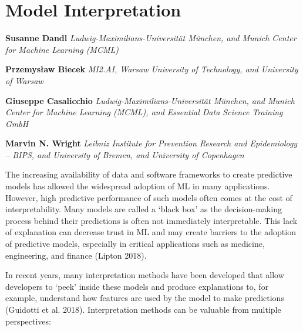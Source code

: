 \hypertarget{sec-interpretation}{%
\chapter{Model Interpretation}\label{sec-interpretation}}

\vspace{-15mm}

\textbf{Susanne Dandl} \newline  \emph{Ludwig-Maximilians-Universität
München, and Munich Center for Machine Learning (MCML)}

\textbf{Przemysław Biecek} \newline  \emph{MI2.AI, Warsaw University of
Technology, and University of Warsaw}

\textbf{Giuseppe Casalicchio} \newline 
\emph{Ludwig-Maximilians-Universität München, and Munich Center for
Machine Learning (MCML), and Essential Data Science Training GmbH}

\textbf{Marvin N. Wright} \newline  \emph{Leibniz Institute for
Prevention Research and Epidemiology -- BIPS, and University of Bremen,
and University of Copenhagen} \newline \newline 

The increasing availability of data and software frameworks to create
predictive models has allowed the widespread adoption of ML in many
applications. However, high predictive performance of such models often
comes at the cost of interpretability. Many
models are called a `black box' as the decision-making
process behind their predictions is often not immediately interpretable.
This lack of explanation can decrease trust in ML and may create
barriers to the adoption of predictive models, especially in critical
applications such as medicine, engineering, and finance (Lipton 2018).

In recent years, many interpretation methods have been developed that
allow developers to `peek' inside these models and produce explanations
to, for example, understand how features are used by the model to make
predictions (Guidotti et al. 2018). Interpretation methods can be
valuable from multiple perspectives:


